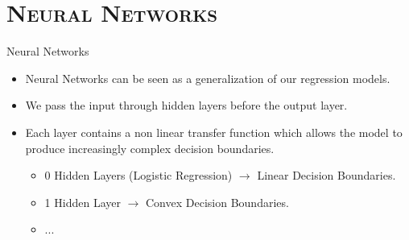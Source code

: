 \section{\scshape Neural Networks}
\begin{frame}{Neural Networks}
	\begin{itemize}
		\item Neural Networks can be seen as a generalization of our regression models.
		\item We pass the input through hidden layers before the output layer.
		\item Each layer contains a non linear transfer function which allows the model to produce increasingly complex decision boundaries.
		      \begin{itemize}
		      	\item 0 Hidden Layers (Logistic Regression) $\rightarrow$ Linear Decision Boundaries.
		      	\item 1 Hidden Layer $\rightarrow$ Convex Decision Boundaries.
		      	\item ...
		      \end{itemize}
	\end{itemize}
\end{frame}


